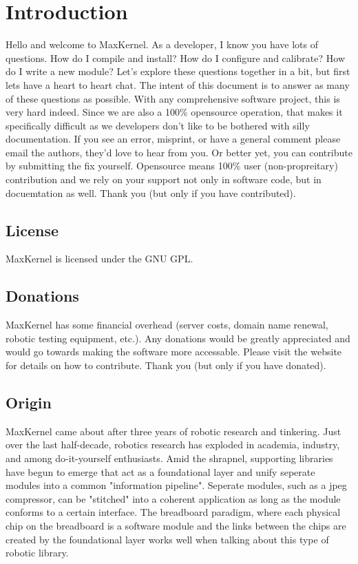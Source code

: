 \section{Introduction}
Hello and welcome to MaxKernel. As a developer, I know you have lots of questions. How do I compile and install? How do I configure and calibrate? How do I write a new module? Let's explore these questions together in a bit, but first lets have a heart to heart chat. The intent of this document is to answer as many of these questions as possible. With any comprehensive software project, this is very hard indeed. Since we are also a 100\% opensource operation, that makes it specifically difficult as we developers don't like to be bothered with silly documentation. If you see an error, misprint, or have a general comment please email the authors, they'd love to hear from you. Or better yet, you can contribute by submitting the fix yourself. Opensource means 100\% user (non-propreitary) contribution and we rely on your support not only in software code, but in docuemtation as well. Thank you (but only if you have contributed).

\subsection{License}
MaxKernel is licensed under the GNU GPL.

\subsection{Donations}
MaxKernel has some financial overhead (server costs, domain name renewal, robotic testing equipment, etc.). Any donations would be greatly appreciated and would go towards making the software more accessable. Please visit the website for details on how to contribute. Thank you (but only if you have donated).

\subsection{Origin}
MaxKernel came about after three years of robotic research and tinkering. Just over the last half-decade, robotics research has exploded in academia, industry, and among do-it-yourself enthusiasts. Amid the shrapnel, supporting libraries have begun to emerge that act as a foundational layer and unify seperate modules into a common "information pipeline". Seperate modules, such as a jpeg compressor, can be "stitched" into a coherent application as long as the module conforms to a certain interface. The breadboard paradigm, where each physical chip on the breadboard is a software module and the links between the chips are created by the foundational layer works well when talking about this type of robotic library.



